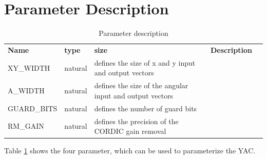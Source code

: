 \documentclass[a4paper, 12pt, notitlepage]{report}
\begin{document}
\section{Parameter Description}
\begin{table}[htbp]
   \center
   \begin{tabular}{@{}lllll@{}}
      \rowcolor{tableheadcolor}\textbf{Name}& \textbf{type} & \textbf{size} & \textbf{Description} \\

      \multirow{1}{*}{XY\_WIDTH}    & natural  & defines the size of x and y input and output vectors \\\midrule
      \multirow{1}{*}{A\_WIDTH}     & natural  & defines the size of the angular input and output vectors \\\midrule
      \multirow{1}{*}{GUARD\_BITS}  & natural  & defines the number of guard bits \\\midrule
      \multirow{1}{*}{RM\_GAIN}     & natural  & defines the precision of the CORDIC gain removal \\\midrule
      \bottomrule
   \end{tabular}
   \caption{Parameter description}
   \label{tab:params}
\end{table} 
Table \ref{tab:params} shows the four parameter, which can be used to parameterize 
the YAC.
\end{document}
